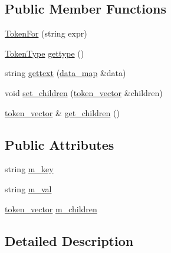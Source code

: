 \subsection*{Public Member Functions}
\begin{DoxyCompactItemize}
\item 
\hyperlink{classxtd_1_1network_1_1http_1_1cpptempl_1_1TokenFor_a536e770283d1ce5e433ad069febdd592}{Token\+For} (string expr)
\item 
\hyperlink{namespacextd_1_1network_1_1http_1_1cpptempl_a39833083d228a5b5ef9f6bb7896479ee}{Token\+Type} \hyperlink{classxtd_1_1network_1_1http_1_1cpptempl_1_1TokenFor_a6901a6f0d625a48ae1ca6abc5b5b4d9e}{gettype} ()
\item 
string \hyperlink{classxtd_1_1network_1_1http_1_1cpptempl_1_1TokenFor_a27dde182755e5a44c3d11f1a1ed9aa65}{gettext} (\hyperlink{namespacextd_1_1network_1_1http_1_1cpptempl_a638d1d81c8fb63c0bbafd508d6a2a007}{data\+\_\+map} \&data)
\item 
void \hyperlink{classxtd_1_1network_1_1http_1_1cpptempl_1_1TokenFor_a8256ae71e4f40e1e84426e837b4090ef}{set\+\_\+children} (\hyperlink{namespacextd_1_1network_1_1http_1_1cpptempl_a38606cfbbfe81ed46ea9b0cf064de956}{token\+\_\+vector} \&children)
\item 
\hyperlink{namespacextd_1_1network_1_1http_1_1cpptempl_a38606cfbbfe81ed46ea9b0cf064de956}{token\+\_\+vector} \& \hyperlink{classxtd_1_1network_1_1http_1_1cpptempl_1_1TokenFor_ab742d87d8aea8968ebb3403333ec021e}{get\+\_\+children} ()
\end{DoxyCompactItemize}
\subsection*{Public Attributes}
\begin{DoxyCompactItemize}
\item 
string \hyperlink{classxtd_1_1network_1_1http_1_1cpptempl_1_1TokenFor_a30879f48f3ad6e5e61f6191a702743e4}{m\+\_\+key}
\item 
string \hyperlink{classxtd_1_1network_1_1http_1_1cpptempl_1_1TokenFor_a262fbad437a0b5aeed05a73c315f865b}{m\+\_\+val}
\item 
\hyperlink{namespacextd_1_1network_1_1http_1_1cpptempl_a38606cfbbfe81ed46ea9b0cf064de956}{token\+\_\+vector} \hyperlink{classxtd_1_1network_1_1http_1_1cpptempl_1_1TokenFor_a2ee55240eafb3c90b7a0c96c0ad253a5}{m\+\_\+children}
\end{DoxyCompactItemize}


\subsection{Detailed Description}


